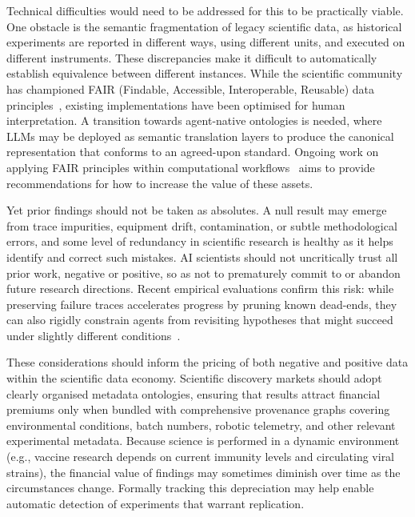 \documentclass[11pt, a4paper, twocolumn, goog]{google}
\begin{document}
Technical difficulties would need to be addressed for this to be practically viable. One obstacle is the semantic fragmentation of legacy scientific data, as historical experiments are reported in different ways, using different units, and executed on different instruments. These discrepancies make it difficult to automatically establish equivalence between different instances. While the scientific community has championed FAIR (Findable, Accessible, Interoperable, Reusable) data principles~\citep{mons2017cloudy}, existing implementations have been optimised for human interpretation. A transition towards agent-native ontologies is needed, where LLMs may be deployed as semantic translation layers to produce the canonical representation that conforms to an agreed-upon standard. Ongoing work on applying FAIR principles within computational workflows~\citep{wilkinson2025applying} aims to provide recommendations for how to increase the value of these assets.

Yet prior findings should not be taken as absolutes. A null result may emerge from trace impurities, equipment drift, contamination, or subtle methodological errors, and some level of redundancy in scientific research is healthy as it helps identify and correct such mistakes. AI scientists should not uncritically trust all prior work, negative or positive, so as not to prematurely commit to or abandon future research directions. Recent empirical evaluations confirm this risk: while preserving failure traces accelerates progress by pruning known dead-ends, they can also rigidly constrain agents from revisiting hypotheses that might succeed under slightly different conditions~\citep{liu2026humanwrittenpaperagentnativeresearch}.

These considerations should inform the pricing of both negative and positive data within the scientific data economy. Scientific discovery markets should adopt clearly organised metadata ontologies, ensuring that results attract financial premiums only when bundled with comprehensive provenance graphs covering environmental conditions, batch numbers, robotic telemetry, and other relevant experimental metadata. Because science is performed in a dynamic environment (e.g., vaccine research depends on current immunity levels and circulating viral strains), the financial value of findings may sometimes diminish over time as the circumstances change. Formally tracking this depreciation may help enable automatic detection of experiments that warrant replication.
\end{document}
